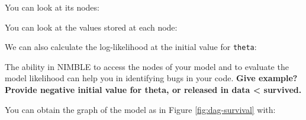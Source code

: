 \documentclass[
  12pt,
]{krantz}
\newenvironment{Shaded}{\begin{snugshade}}{\end{snugshade}}
\newcommand{\CommentTok}[1]{\textcolor[rgb]{0.56,0.35,0.01}{\textit{#1}}}
\newcommand{\DocumentationTok}[1]{\textcolor[rgb]{0.56,0.35,0.01}{\textbf{\textit{#1}}}}
\newcommand{\FunctionTok}[1]{\textcolor[rgb]{0.00,0.00,0.00}{#1}}
\newcommand{\NormalTok}[1]{#1}
\newcommand{\SpecialCharTok}[1]{\textcolor[rgb]{0.00,0.00,0.00}{#1}}
\begin{document}
You can look at its nodes:

\begin{Shaded}
\end{Shaded}

You can look at the values stored at each node:

\begin{Shaded}
\end{Shaded}

We can also calculate the log-likelihood at the initial value for \texttt{theta}:

\begin{Shaded}
\end{Shaded}

The ability in NIMBLE to access the nodes of your model and to evaluate the model likelihood can help you in identifying bugs in your code. \textbf{Give example? Provide negative initial value for theta, or released in data \textless{} survived.}

You can obtain the graph of the model as in Figure \ref{fig:dag-survival} with:

\begin{Shaded}
\end{Shaded}
\end{document}
